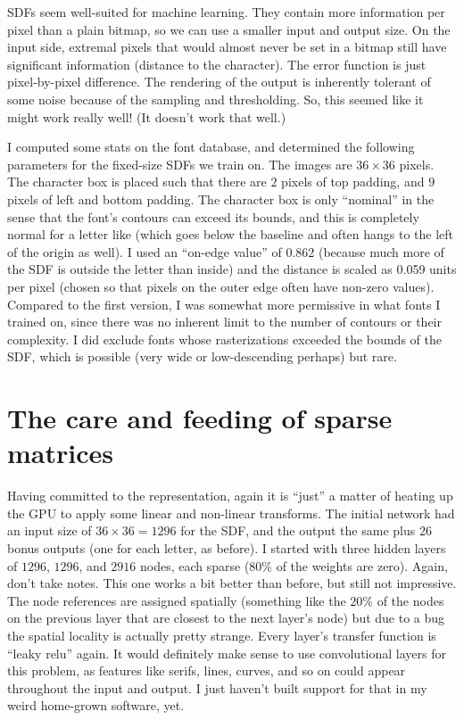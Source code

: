 \documentclass[twocolumn]{article}
\begin{document}
SDFs seem well-suited for machine learning. They contain more
information per pixel than a plain bitmap, so we can use a smaller
input and output size. On the input side, extremal pixels that would
almost never be set in a bitmap still have significant information
(distance to the character). The error function is just pixel-by-pixel
difference. The rendering of the output is inherently tolerant of some
noise because of the sampling and thresholding. So, this seemed like
it might work really well! (It doesn't work that well.)

I computed some stats on the font database, and determined the
following parameters for the fixed-size SDFs we train on. The images
are $36 \times 36$ pixels. The character box is placed such that there
are $2$ pixels of top padding, and $9$ pixels of left and bottom
padding. The character box is only ``nominal'' in the sense that the
font's contours can exceed its bounds, and this is completely normal
for a letter like  (which goes below the baseline and
often hangs to the left of the origin as well). I used an ``on-edge
value'' of 0.862 (because much more of the SDF is outside the letter
than inside) and the distance is scaled as 0.059 units per pixel
(chosen so that pixels on the outer edge often have non-zero values).
Compared to the first version, I was somewhat more permissive in what
fonts I trained on, since there was no inherent limit to the number of
contours or their complexity. I did exclude fonts whose rasterizations
exceeded the bounds of the SDF, which is possible (very wide
 or low-descending  perhaps) but rare.

\section{The care and feeding of sparse matrices} \label{sec:neural}

Having committed to the representation, again it is ``just'' a matter
of heating up the GPU to apply some linear and non-linear transforms.
The initial network had an input size of $36 \times 36 = 1296$ for the
SDF, and the output the same plus $26$ bonus outputs (one for each
letter, as before). I started with three hidden layers of $1296$, $1296$,
and $2916$ nodes, each sparse ($80\%$ of the weights are zero). Again,
don't take notes. This one works a bit better than before, but still
not impressive. The node references are assigned spatially (something
like the $20\%$ of the nodes on the previous layer that are closest to
the next layer's node) but due to a bug the spatial locality is
actually pretty strange.
Every layer's transfer function is ``leaky relu'' again. It would
definitely make sense to use convolutional layers for this problem, as
features like serifs, lines, curves, and so on could appear throughout
the input and output. I just haven't built support for that in my
weird home-grown software, yet.
\end{document}
